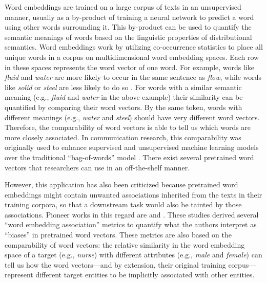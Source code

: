 Word embeddings are trained on a large corpus of texts in an unsupervised manner, usually as a by-product of training a neural network to predict a word using other words surrounding it. This by-product can be used to quantify the semantic meanings of words based on the linguistic properties of distributional semantics. Word embeddings work by utilizing co-occurrence statistics to place all unique words in a corpus on multidimensional word embedding spaces. Each row in these spaces represents the word vector of one word. For example, words like \textit{fluid} and \textit{water} are more likely to occur in the same sentence as \textit{flow}, while words like \textit{solid} or \textit{steel} are less likely to do so \parencite{pennington:2014:G}. For words with a similar semantic meaning (e.g., \textit{fluid} and \textit{water} in the above example) their similarity can be quantified by comparing their word vectors. By the same token, words with different meanings (e.g., \textit{water} and \textit{steel}) should have very different word vectors. Therefore, the comparability of word vectors is able to tell us which words are more closely associated. In communication research, this comparability was originally used to enhance supervised and unsupervised machine learning models over the traditional ``bag-of-words'' model \parencite[e.g.,][]{Rudkowsky2018,atteveldt:2021:VSA}. There exist several pretrained word vectors that researchers can use in an off-the-shelf manner.

However, this application has also been criticized because pretrained word embeddings might contain unwanted associations inherited from the texts in their training corpora, so that a downstream task would also be tainted by those associations. Pioneer works in this regard are \textcite{caliskan:2017:S} and \textcite{garg:2018:W}. These studies derived several ``word embedding association'' metrics to quantify what the authors interpret as ``biases'' in pretrained word vectors. These metrics are also based on the comparability of word vectors: the relative similarity in the word embedding space of a target (e.g., \textit{nurse}) with different attributes (e.g., \textit{male} and \textit{female}) can tell us how the word vectors---and by extension, their original training corpus---represent different target entities to be implicitly associated with other entities. 

